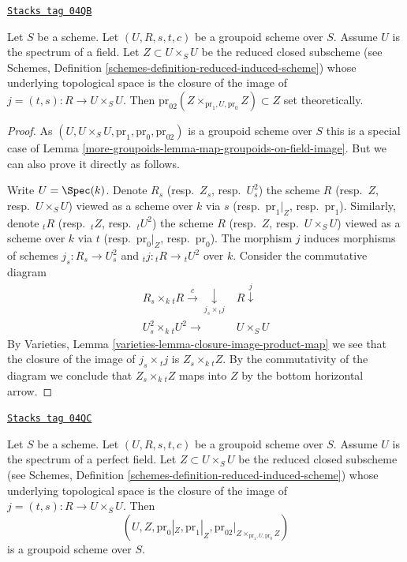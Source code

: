 \begin{lemma}
\label{more-groupoids-lemma-groupoid-on-field-image}
\href{https://stacks.math.columbia.edu/tag/04QB}{\texttt{Stacks tag 04QB}}

Let $S$ be a scheme. Let $(U, R, s, t, c)$ be a groupoid scheme
over $S$. Assume $U$ is the spectrum of a field.
Let $Z \subset U \times_S U$ be the reduced closed subscheme (see
Schemes, Definition \ref{schemes-definition-reduced-induced-scheme})
whose underlying topological space is the closure of the image of
$j = (t, s) : R \to U \times_S U$. Then
$\text{pr}_{02}(Z \times_{\text{pr}_1, U, \text{pr}_0} Z) \subset Z$
set theoretically.
\end{lemma}

\begin{proof}
As $(U, U \times_S U, \text{pr}_1, \text{pr}_0, \text{pr}_{02})$
is a groupoid scheme over $S$ this is a special case of
Lemma \ref{more-groupoids-lemma-map-groupoids-on-field-image}.
But we can also prove it directly as follows.

\medskip\noindent
Write $U = \Spec(k)$. Denote
$R_s$ (resp.\ $Z_s$, resp.\ $U^2_s$) the scheme
$R$ (resp.\ $Z$, resp.\ $U \times_S U$) viewed as a scheme over $k$ via
$s$ (resp.\ $\text{pr}_1|_Z$, resp.\ $\text{pr}_1$).
Similarly, denote
${}_tR$ (resp.\ ${}_tZ$, resp.\ ${}_tU^2$) the scheme
$R$ (resp.\ $Z$, resp.\ $U \times_S U$) viewed as a scheme over $k$ via
$t$ (resp.\ $\text{pr}_0|_Z$, resp.\ $\text{pr}_0$).
The morphism $j$ induces morphisms of schemes
$j_s : R_s \to U^2_s$ and ${}_tj : {}_tR \to {}_tU^2$ over $k$.
Consider the commutative diagram
$$
\begin{array}{cc}R_s \times_k {}_tR \overset{c}{\longrightarrow}\underset{j_s \times {}_tj}{\downarrow} & R \overset{j}{\downarrow} \\ U^2_s \times_k {}_tU^2 \longrightarrow & U \times_S U\end{array}
$$
By
Varieties, Lemma \ref{varieties-lemma-closure-image-product-map}
we see that the closure of the image of $j_s \times {}_tj$ is
$Z_s \times_k {}_tZ$. By the commutativity of the diagram we
conclude that $Z_s \times_k {}_tZ$ maps into $Z$ by the bottom
horizontal arrow.
\end{proof}

\begin{lemma}
\label{more-groupoids-lemma-groupoid-on-perfect-field-image}
\href{https://stacks.math.columbia.edu/tag/04QC}{\texttt{Stacks tag 04QC}}

Let $S$ be a scheme. Let $(U, R, s, t, c)$ be a groupoid scheme
over $S$. Assume $U$ is the spectrum of a perfect field.
Let $Z \subset U \times_S U$ be the reduced closed subscheme (see
Schemes, Definition \ref{schemes-definition-reduced-induced-scheme})
whose underlying topological space is the closure of the image of
$j = (t, s) : R \to U \times_S U$.
Then
$$
(U, Z, \text{pr}_0|_Z, \text{pr}_1|_Z,
\text{pr}_{02}|_{Z \times_{\text{pr}_1, U, \text{pr}_0} Z})
$$
is a groupoid scheme over $S$.
\end{lemma}

